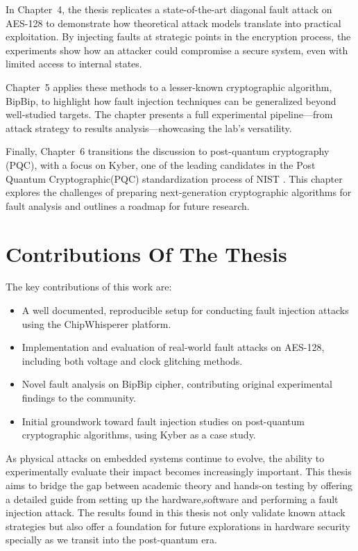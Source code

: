 In Chapter~4, the thesis replicates a state-of-the-art diagonal fault attack on AES-128 to demonstrate how theoretical attack models translate into practical exploitation. By injecting faults at strategic points in the encryption process, the experiments show how an attacker could compromise a secure system, even with limited access to internal states.

Chapter~5 applies these methods to a lesser-known cryptographic algorithm, BipBip, to highlight how fault injection techniques can be generalized beyond well-studied targets. The chapter presents a full experimental pipeline—from attack strategy to results analysis—showcasing the lab’s versatility.

Finally, Chapter~6 transitions the discussion to post-quantum cryptography (PQC), with a focus on Kyber, one of the leading candidates in the Post Quantum Cryptographic(PQC) standardization process of NIST . This chapter explores the challenges of preparing next-generation cryptographic algorithms for fault analysis and outlines a roadmap for future research.

\section*{Contributions Of The Thesis}

The key contributions of this work are:
\begin{itemize}
    \item A well documented, reproducible setup for conducting fault injection attacks using the ChipWhisperer platform.
    \item Implementation and evaluation of real-world fault attacks on AES-128, including both voltage and clock glitching methods.
    \item Novel fault analysis on BipBip cipher, contributing original experimental findings to the community.
    \item Initial groundwork toward fault injection studies on post-quantum cryptographic algorithms, using Kyber as a case study.
\end{itemize}


As physical attacks on embedded systems continue to evolve, the ability to experimentally evaluate their impact becomes increasingly important. This thesis aims to bridge the gap between academic theory and hands-on testing by offering a detailed guide from setting up the hardware,software and performing a fault injection attack. The results found in this thesis not only validate known attack strategies but also offer a foundation for future explorations in hardware security specially as we transit into the post-quantum era.


